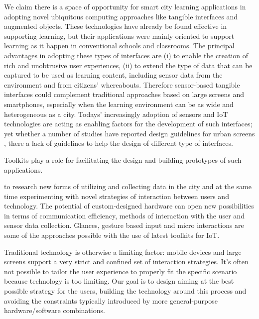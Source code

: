 We claim there is a space of opportunity for smart city learning applications in adopting novel ubiquitous computing approaches like tangible interfaces and augmented objects. These technologies have already be found effective in supporting learning\cite{stanton_classroom_2001}, but their applications were mainly oriented to support learning as it happen in conventional schools and classrooms. The principal advantages in adopting these types of interfaces are (i) to enable the creation of rich and unobtrusive user experiences, (ii) to extend the type of data that can be captured to be used as learning content, including sensor data from the environment and from citizens' whereabouts. Therefore sensor-based tangible interfaces could complement traditional approaches based on large screens and smartphones, especially when the learning environment can be as wide and heterogeneous as a city. Todays' increasingly adoption of sensors and IoT technologies are acting as enabling factors for the development of such interfaces; yet whether a number of studies have reported design guidelines for urban screens \cite{}, there a lack of guidelines to help the design of different type of interfaces.

Toolkits play a role for facilitating the design and building prototypes of such applications.




to research new forms of utilizing and collecting data in the city and at the same time experimenting with novel strategies of interaction between users and technology.
The potential of custom-designed hardware can open new possibilities in terms of communication efficiency, methods of interaction with the user and sensor data collection.
Glances, gesture based input and micro interactions are some of the approaches possible with the use of latest toolkits for IoT.

Traditional technology is otherwise a limiting factor: mobile devices and large screens support a very strict and confined set of interaction strategies. It's often not possible to tailor the user experience to properly fit the specific scenario because technology is too limiting.
Our goal is to design aiming at the best possible strategy for the users, building the technology around this process and avoiding the constraints typically introduced by more general-purpose hardware/software combinations.

